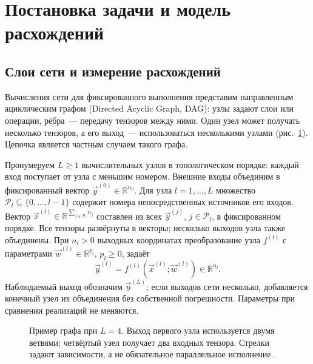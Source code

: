 \section{Постановка задачи и модель расхождений}
\label{sec:model}

\subsection{Слои сети и измерение расхождений}

Вычисления сети для фиксированного выполнения представим направленным
ациклическим графом (Directed Acyclic Graph, DAG): узлы задают слои
или операции, рёбра~--- передачу тензоров между ними.
Один узел может получать несколько тензоров, а его выход~---
использоваться несколькими узлами (рис.~\ref{fig:transport}).
Цепочка является частным случаем такого графа.

Пронумеруем $L\ge1$ вычислительных узлов в топологическом порядке:
каждый вход поступает от узла с меньшим номером.
Внешние входы объединим в фиксированный вектор
$\Vec{y}^{(0)}\in\mathbb{R}^{n_0}$.
Для узла $l=1,\ldots,L$ множество $\mathcal{P}_l\subseteq\{0,\ldots,l-1\}$
содержит номера непосредственных источников его входов.
Вектор $\Vec{x}^{(l)}\in\mathbb{R}^{\sum_{j\in\mathcal{P}_l}n_j}$
составлен из всех $\Vec{y}^{(j)}$, $j\in\mathcal{P}_l$,
в фиксированном порядке.
Все тензоры развёрнуты в векторы; несколько выходов узла также объединены.
При $n_l>0$ выходных координатах преобразование узла $f^{(l)}$
с параметрами $\Vec{w}^{(l)}\in\mathbb{R}^{p_l}$, $p_l\ge0$, задаёт
\[
    \Vec{y}^{(l)}=f^{(l)}(\Vec{x}^{(l)};\Vec{w}^{(l)})
    \in\mathbb{R}^{n_l}.
\]
Наблюдаемый выход обозначим $\Vec{y}^{(L)}$; если выходов сети несколько,
добавляется конечный узел их объединения без собственной погрешности.
Параметры при сравнении реализаций не меняются.

\begin{figure}[htbp]
    \centering
    \caption{Пример графа при $L=4$.
        Выход первого узла используется двумя ветвями;
        четвёртый узел получает два входных тензора.
        Стрелки задают зависимости, а не обязательное параллельное исполнение.}
    \label{fig:transport}
\end{figure}

